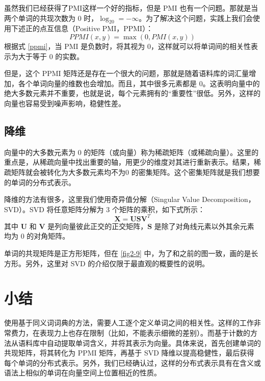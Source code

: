 虽然我们已经获得了PMI这样一个好的指标，但是 PMI 也有一个问题。那就是当两个单词的共现次数为 0 时，$\log_20 = -\infty$。为了解决这个问题，实践上我们会使用下述正的点互信息（Positive PMI，PPMI）：
\begin{equation}
    \label{ppmi}
    PPMI(x, y)=\max(0, PMI(x, y))
\end{equation}
根据式 \autoref{ppmi}，当 PMI 是负数时，将其视为 0，这样就可以将单词间的相关性表示为大于等于 0 的实数。

但是，这个 PPMI 矩阵还是存在一个很大的问题，那就是随着语料库的词汇量增加，各个单词向量的维数也会增加。而且，其中很多元素都是 0。这表明向量中的绝大多数元素并不重要，也就是说，每个元素拥有的“重要性”很低。另外，这样的向量也容易受到噪声影响，稳健性差。
\subsection{降维}
\begin{tcolorbox}
    向量中的大多数元素为 0 的矩阵（或向量）称为稀疏矩阵（或稀疏向量）。这里的重点是，从稀疏向量中找出重要的轴，用更少的维度对其进行重新表示。结果，稀疏矩阵就会被转化为大多数元素均不为0 的密集矩阵。这个密集矩阵就是我们想要的单词的分布式表示。
\end{tcolorbox}

降维的方法有很多，这里我们使用奇异值分解（Singular Value Decomposition，SVD）。SVD 将任意矩阵分解为 3 个矩阵的乘积，如下式所示：
\begin{equation}
    \bm{X}=\bm{U}\bm{S}\bm{V}^T
\end{equation}
其中 $\bm{U}$ 和 $\bm{V}$ 是列向量彼此正交的正交矩阵，$\bm{S}$ 是除了对角线元素以外其余元素均为 0 的对角矩阵。
\begin{tcolorbox}
    单词的共现矩阵是正方形矩阵，但在 \autoref{fig2-9} 中，为了和之前的图一致，画的是长方形。另外，这里对 SVD 的介绍仅限于最直观的概要性的说明。
\end{tcolorbox}
\section{小结}
使用基于同义词词典的方法，需要人工逐个定义单词之间的相关性。这样的工作非常费力，在表现力上也存在限制（比如，不能表示细微的差别）。而基于计数的方法从语料库中自动提取单词含义，并将其表示为向量。具体来说，首先创建单词的共现矩阵，将其转化为 PPMI 矩阵，再基于 SVD 降维以提高稳健性，最后获得每个单词的分布式表示。另外，我们已经确认过，这样的分布式表示具有在含义或语法上相似的单词在向量空间上位置相近的性质。